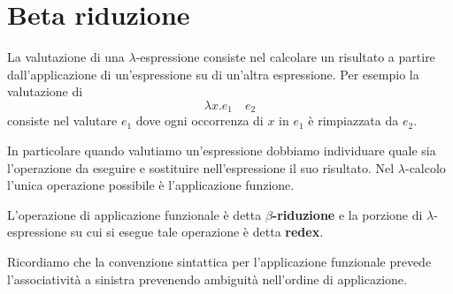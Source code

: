 \section{Beta riduzione}
La valutazione di una $\lambda$-espressione consiste nel calcolare un risultato a partire dall'applicazione di
un'espressione su di un'altra espressione. Per esempio la valutazione di
\[ \lambda x.e_1 \quad e_2 \]
consiste nel valutare $e_1$ dove ogni occorrenza di $x$ in $e_1$ è rimpiazzata da $e_2$.

In particolare quando valutiamo un'espressione dobbiamo individuare quale sia l'operazione da eseguire e sostituire
nell'espressione il suo risultato. Nel $\lambda$-calcolo l'unica operazione possibile è l'applicazione funzione.

L'operazione di applicazione funzionale è detta \textbf{$\beta$-riduzione} e la porzione di $\lambda$-espressione su
cui si esegue tale operazione è detta \textbf{redex}.

Ricordiamo che la convenzione sintattica per l'applicazione funzionale prevede l'associatività a sinistra prevenendo
ambiguità nell'ordine di applicazione.